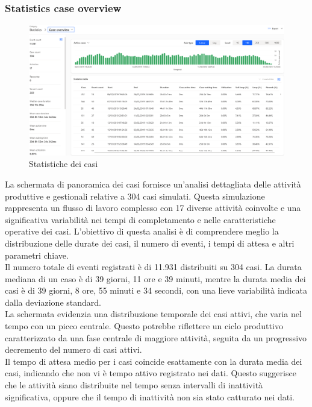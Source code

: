 \documentclass{article}
\begin{document}
\subsubsection{Statistics case overview}
\begin{figure}[H]
    \centering
    \includegraphics[width=\textwidth]{imgMicrosoft/TerzaSimulazione/StatisticsCaseOverviewSimulazione3.png}
    \caption{Statistiche dei casi}
    \label{fig:statistics-case-overview}
\end{figure}
La schermata di panoramica dei casi fornisce un'analisi dettagliata delle attività produttive e gestionali relative a 304 casi simulati. Questa simulazione rappresenta un flusso di lavoro complesso con 17 diverse attività coinvolte e una significativa variabilità nei tempi di completamento e nelle caratteristiche operative dei casi. L'obiettivo di questa analisi è di comprendere meglio la distribuzione delle durate dei casi, il numero di eventi, i tempi di attesa e altri parametri chiave.\\
Il numero totale di eventi registrati è di 11.931 distribuiti su 304 casi. La durata mediana di un caso è di 39 giorni, 11 ore e 39 minuti, mentre la durata media dei casi è di 39 giorni, 8 ore, 55 minuti e 34 secondi, con una lieve variabilità indicata dalla deviazione standard.\\
La schermata evidenzia una distribuzione temporale dei casi attivi, che varia nel tempo con un picco centrale. Questo potrebbe riflettere un ciclo produttivo caratterizzato da una fase centrale di maggiore attività, seguita da un progressivo decremento del numero di casi attivi.\\
Il tempo di attesa medio per i casi coincide esattamente con la durata media dei casi, indicando che non vi è tempo attivo registrato nei dati. Questo suggerisce che le attività siano distribuite nel tempo senza intervalli di inattività significativa, oppure che il tempo di inattività non sia stato catturato nei dati.\\
\end{document}

